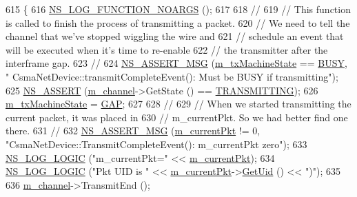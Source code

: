 \begin{DoxyCode}
615 \{
616   \hyperlink{log-macros-disabled_8h_a8f7e4afc291c9d29a65c18ac1f79197b}{NS\_LOG\_FUNCTION\_NOARGS} ();
617 
618   \textcolor{comment}{//}
619   \textcolor{comment}{// This function is called to finish the  process of transmitting a packet.}
620   \textcolor{comment}{// We need to tell the channel that we've stopped wiggling the wire and}
621   \textcolor{comment}{// schedule an event that will be executed when it's time to re-enable}
622   \textcolor{comment}{// the transmitter after the interframe gap.}
623   \textcolor{comment}{//}
624   \hyperlink{assert_8h_aff5ece9066c74e681e74999856f08539}{NS\_ASSERT\_MSG} (\hyperlink{classns3_1_1CsmaNetDevice_af07031cad3f8bd8c4b33ba77fa706e99}{m\_txMachineState} == \hyperlink{classns3_1_1CsmaNetDevice_a46c532357164a954c46a01f05f8d78f4a84e62edebfa7e85ec23402f94bb1361a}{BUSY}, \textcolor{stringliteral}{"
      CsmaNetDevice::transmitCompleteEvent(): Must be BUSY if transmitting"});
625   \hyperlink{assert_8h_a6dccdb0de9b252f60088ce281c49d052}{NS\_ASSERT} (\hyperlink{classns3_1_1CsmaNetDevice_a5c3ecdf9a63006b106dff1c110e736ff}{m\_channel}->GetState () == \hyperlink{namespacens3_aff37503a9e9f2dbe82b374050a73e105a5c6ba0512d778b658dc105cc604de3b3}{TRANSMITTING});
626   \hyperlink{classns3_1_1CsmaNetDevice_af07031cad3f8bd8c4b33ba77fa706e99}{m\_txMachineState} = \hyperlink{classns3_1_1CsmaNetDevice_a46c532357164a954c46a01f05f8d78f4ab6c58ad6a7f71f004ea78a8ccb9362c6}{GAP};
627 
628   \textcolor{comment}{//}
629   \textcolor{comment}{// When we started transmitting the current packet, it was placed in }
630   \textcolor{comment}{// m\_currentPkt.  So we had better find one there.}
631   \textcolor{comment}{//}
632   \hyperlink{assert_8h_aff5ece9066c74e681e74999856f08539}{NS\_ASSERT\_MSG} (\hyperlink{classns3_1_1CsmaNetDevice_a83f2aa389f676dec6bd1ff056bd61942}{m\_currentPkt} != 0, \textcolor{stringliteral}{"CsmaNetDevice::TransmitCompleteEvent():
       m\_currentPkt zero"});
633   \hyperlink{group__logging_ga88acd260151caf2db9c0fc84997f45ce}{NS\_LOG\_LOGIC} (\textcolor{stringliteral}{"m\_currentPkt="} << \hyperlink{classns3_1_1CsmaNetDevice_a83f2aa389f676dec6bd1ff056bd61942}{m\_currentPkt});
634   \hyperlink{group__logging_ga88acd260151caf2db9c0fc84997f45ce}{NS\_LOG\_LOGIC} (\textcolor{stringliteral}{"Pkt UID is "} << \hyperlink{classns3_1_1CsmaNetDevice_a83f2aa389f676dec6bd1ff056bd61942}{m\_currentPkt}->\hyperlink{classns3_1_1Packet_a1f212c825b50e54d94f5b9ae99592e6a}{GetUid} () << \textcolor{stringliteral}{")"});
635 
636   \hyperlink{classns3_1_1CsmaNetDevice_a5c3ecdf9a63006b106dff1c110e736ff}{m\_channel}->TransmitEnd (); 

\end{DoxyCode}
